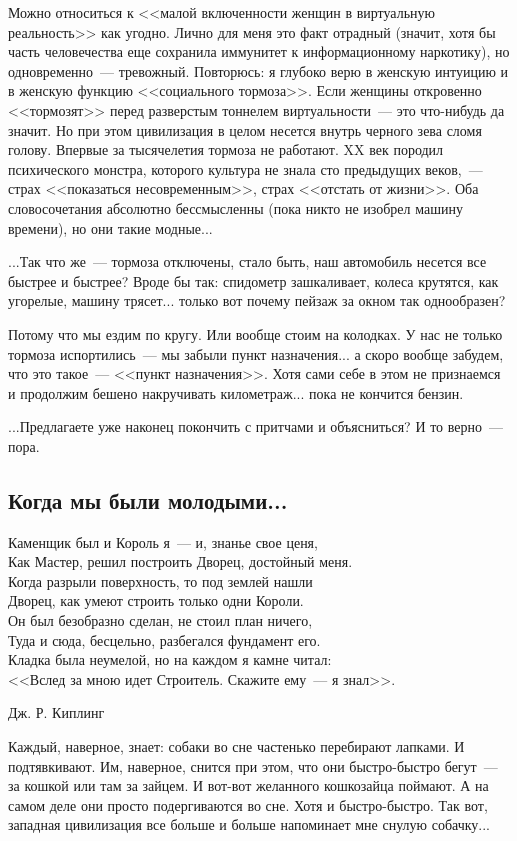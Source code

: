 \documentclass{scrbook}
\makeatletter
\newcommand{\bigepigraphwidth}{0.8} %
\newcommand{\defaultepigraphwidth}{0.5} %
\newcommand{\flqq}{<<}
\newcommand{\frqq}{>>}
\newcommand{\mdash}{~--- }
\newcommand{\commamdash}{~--- } %
\newcommand{\essaysection}[1]{\subsection*{#1}\nopagebreak}
\newcommand{\myepigraph}[3][\@empty]{
	\ifx\@empty#1
		\setlength{\epigraphwidth}{\defaultepigraphwidth\textwidth}
	\else
		\setlength{\epigraphwidth}{#1\textwidth}
	\fi
	\epigraph{#2}{#3}
	\setlength{\epigraphwidth}{\defaultepigraphwidth\textwidth} %
	\nopagebreak
}
\makeatother
\begin{document}
Можно относиться к {\flqq}малой включенности женщин в виртуальную реальность{\frqq} как угодно. Лично для меня это факт отрадный (значит, хотя бы часть человечества еще сохранила иммунитет к информационному наркотику), но одновременно{\mdash}тревожный. Повторюсь: я глубоко верю в женскую интуицию и в женскую функцию {\flqq}социального тормоза{\frqq}. Если женщины откровенно {\flqq}тормозят{\frqq} перед разверстым тоннелем виртуальности{\mdash}это что-нибудь да значит. Но при этом цивилизация в целом несется внутрь черного зева сломя голову. Впервые за тысячелетия тормоза не работают. XX век породил психического монстра, которого культура не знала сто предыдущих веков,{\commamdash}страх {\flqq}показаться несовременным{\frqq}, страх {\flqq}отстать от жизни{\frqq}. Оба словосочетания абсолютно бессмысленны (пока никто не изобрел машину времени), но они такие модные...

...Так что же{\mdash}тормоза отключены, стало быть, наш автомобиль несется все быстрее и быстрее? Вроде бы так: спидометр зашкаливает, колеса крутятся, как угорелые, машину трясет... только вот почему пейзаж за окном так однообразен?

Потому что мы ездим по кругу. Или вообще стоим на колодках. У нас не только тормоза испортились{\mdash}мы забыли пункт назначения... а скоро вообще забудем, что это такое{\mdash}{\flqq}пункт назначения{\frqq}. Хотя сами себе в этом не признаемся и продолжим бешено накручивать километраж... пока не кончится бензин.

...Предлагаете уже наконец покончить с притчами и объясниться? И то верно{\mdash}пора.

\essaysection{Когда мы были молодыми...}

\myepigraph[\bigepigraphwidth]{Каменщик был и Король я{\mdash}и, знанье свое ценя, \\
Как Мастер, решил построить Дворец, достойный меня. \\
Когда разрыли поверхность, то под землей нашли \\
Дворец, как умеют строить только одни Короли. \\
Он был безобразно сделан, не стоил план ничего, \\
Туда и сюда, бесцельно, разбегался фундамент его. \\
Кладка была неумелой, но на каждом я камне читал: \\
{\flqq}Вслед за мною идет Строитель. Скажите ему{\mdash}я знал{\frqq}.}
{Дж. Р. Киплинг}

Каждый, наверное, знает: собаки во сне частенько перебирают лапками. И подтявкивают. Им, наверное, снится при этом, что они быстро-быстро бегут{\mdash}за кошкой или там за зайцем. И вот-вот желанного кошкозайца поймают. А на самом деле они просто подергиваются во сне. Хотя и быстро-быстро. Так вот, западная цивилизация все больше и больше напоминает мне снулую собачку...
\end{document}
